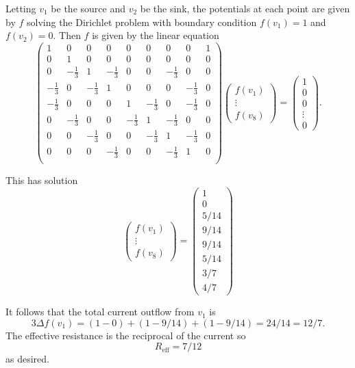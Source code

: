 \documentclass[12 pt, letterpaper]{hmcpset}
\begin{document}
\begin{solution}
	Letting $v_{1}$ be the source and $v_{2}$ be the sink, the potentials at each point are given by $f$ solving the Dirichlet problem with boundary condition $f(v_{1}) = 1$ and $f(v_{2}) = 0$. Then $f$ is given by the linear equation
	\[
		\begin{pmatrix}
   1 &    0 &    0 &    0 &    0 &    0 &    0 &    0 & 1 \\
   0 &    1 &    0 &    0 &    0 &    0 &    0 &    0 & 0 \\
   0 & -\frac{1}{3} &    1 & -\frac{1}{3} &    0 &    0 & -\frac{1}{3} &    0 & 0 \\
-\frac{1}{3} &    0 & -\frac{1}{3} &    1 &    0 &    0 &    0 & -\frac{1}{3} & 0 \\
-\frac{1}{3} &    0 &    0 &    0 &    1 & -\frac{1}{3} &    0 & -\frac{1}{3} & 0 \\
   0 & -\frac{1}{3} &    0 &    0 & -\frac{1}{3} &    1 & -\frac{1}{3} &    0 & 0 \\
   0 &    0 & -\frac{1}{3} &    0 &    0 & -\frac{1}{3} &    1 & -\frac{1}{3} & 0 \\
   0 &    0 &    0 & -\frac{1}{3} &    0 &    0 & -\frac{1}{3} &    1 & 0 \\
 
\end{pmatrix} \begin{pmatrix}
	f(v_{1}) \\
	\vdots \\
	f(v_{8})
\end{pmatrix} = \begin{pmatrix}
	1 \\
	0 \\
	0 \\
	\vdots \\
	0
\end{pmatrix}.
	\]

	This has solution
	\[
		\begin{pmatrix}
	f(v_{1}) \\
	\vdots \\
	f(v_{8})
\end{pmatrix} = \begin{pmatrix}
	1 \\
	0 \\
	5 / 14 \\
	9 / 14 \\
	9 / 14 \\
	5 / 14 \\
	3 / 7 \\
	4 / 7
\end{pmatrix}
	\]

	It follows that the total current outflow from $v_{1}$ is
	\[
		3 \Delta f(v_{1}) = (1 - 0) + (1 - 9 / 14) + (1 - 9 / 14) = 24/14 = 12/7.
	\]
	The effective resistance is the reciprocal of the current so
	\[
		R_{\text{eff}} = 7/12
	\]
	as desired.
\end{solution}
\end{document}
